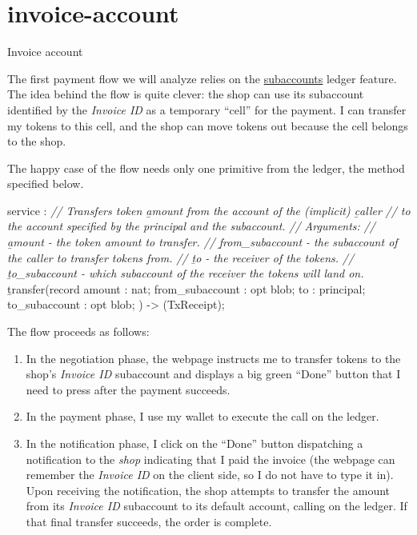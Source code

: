 \documentclass{article}
\begin{document}
\section{invoice-account}{Invoice account}

The first payment flow we will analyze relies on the \href{/posts/09-fungible-tokens-101.html#subaccounts}{subaccounts} ledger feature.
The idea behind the flow is quite clever: the shop can use its subaccount identified by the \emph{Invoice ID} as a temporary ``cell'' for the payment.
I can transfer my tokens to this cell, and the shop can move tokens out because the cell belongs to the shop.

The happy case of the flow needs only one primitive from the ledger, the  method specified below.

\begin{code}[candid]
service : {
  \emph{// Transfers token \b{amount} from the account of the (implicit) \b{caller}}
  \emph{// to the account specified by the principal and the subaccount.}
  \emph{// Arguments:}
  \emph{//   \b{amount} - the token amount to transfer.}
  \emph{//   \b{from_subaccount} - the subaccount of the caller to transfer tokens from.}
  \emph{//   \b{to} - the receiver of the tokens.}
  \emph{//   \b{to_subaccount} - which subaccount of the receiver the tokens will land on.}
  \b{transfer}(record {
    amount : nat;
    from_subaccount : opt blob;
    to : principal;
    to_subaccount : opt blob;
  }) -> (TxReceipt);
}
\end{code}

The flow proceeds as follows:
\begin{enumerate}
  \item
    In the negotiation phase, the webpage instructs me to transfer tokens to the shop's \emph{Invoice ID} subaccount and displays a big green ``Done'' button that I need to press after the payment succeeds.
  \item
    In the payment phase, I use my wallet to execute the  call on the ledger.
  \item
    In the notification phase, I click on the ``Done'' button dispatching a notification to the \emph{shop} indicating that I paid the invoice (the webpage can remember the \emph{Invoice ID} on the client side, so I do not have to type it in).
    Upon receiving the notification, the shop attempts to transfer the amount from its \emph{Invoice ID} subaccount to its default account, calling  on the ledger.
    If that final transfer succeeds, the order is complete.
\end{enumerate}
\end{document}
